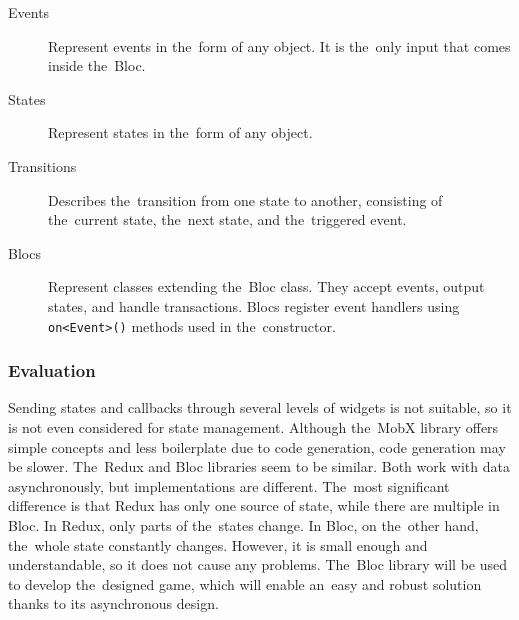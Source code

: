 \pagebreak

\begin{description}
    \item[Events] Represent events in the~form of any object.
    It is the~only input that comes inside the~Bloc.
    \item[States] Represent states in the~form of any object.
    \item[Transitions] Describes the~transition from one state to another, consisting of the~current state, the~next state, and the~triggered event.
    \item[Blocs] Represent classes extending the~Bloc class.
    They accept events, output states, and handle transactions.
    Blocs register event handlers using \texttt{on<Event>()} methods used in the~constructor.
\end{description}

\subsubsection{Evaluation}

Sending states and callbacks through several levels of widgets is not suitable, so it is not even considered for state management.
Although the~MobX library offers simple concepts and less boilerplate due to code generation, code generation may be slower.
The~Redux and Bloc libraries seem to be similar.
Both work with data asynchronously, but implementations are different.
The~most significant difference is that Redux has only one source of state, while there are multiple in Bloc.
In Redux, only parts of the~states change.
In Bloc, on the~other hand, the~whole state constantly changes.
However, it is small enough and understandable, so it does not cause any problems.
The~Bloc library will be used to develop the~designed game, which will enable an~easy and robust solution thanks to its asynchronous design.
